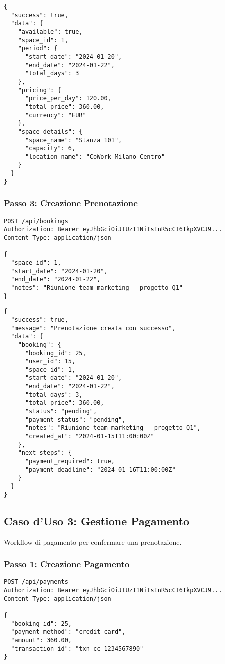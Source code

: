 \begin{lstlisting}[caption=Risposta Disponibilità Confermata]
{
  "success": true,
  "data": {
    "available": true,
    "space_id": 1,
    "period": {
      "start_date": "2024-01-20",
      "end_date": "2024-01-22",
      "total_days": 3
    },
    "pricing": {
      "price_per_day": 120.00,
      "total_price": 360.00,
      "currency": "EUR"
    },
    "space_details": {
      "space_name": "Stanza 101",
      "capacity": 6,
      "location_name": "CoWork Milano Centro"
    }
  }
}
\end{lstlisting}

\subsubsection{Passo 3: Creazione Prenotazione}
\begin{lstlisting}[style=httpstyle, caption=Creazione Prenotazione]
POST /api/bookings
Authorization: Bearer eyJhbGciOiJIUzI1NiIsInR5cCI6IkpXVCJ9...
Content-Type: application/json

{
  "space_id": 1,
  "start_date": "2024-01-20",
  "end_date": "2024-01-22",
  "notes": "Riunione team marketing - progetto Q1"
}
\end{lstlisting}

\newpage

\begin{lstlisting}[caption=Risposta Prenotazione Creata]
{
  "success": true,
  "message": "Prenotazione creata con successo",
  "data": {
    "booking": {
      "booking_id": 25,
      "user_id": 15,
      "space_id": 1,
      "start_date": "2024-01-20",
      "end_date": "2024-01-22",
      "total_days": 3,
      "total_price": 360.00,
      "status": "pending",
      "payment_status": "pending",
      "notes": "Riunione team marketing - progetto Q1",
      "created_at": "2024-01-15T11:00:00Z"
    },
    "next_steps": {
      "payment_required": true,
      "payment_deadline": "2024-01-16T11:00:00Z"
    }
  }
}
\end{lstlisting}

\subsection{Caso d'Uso 3: Gestione Pagamento}
Workflow di pagamento per confermare una prenotazione.

\subsubsection{Passo 1: Creazione Pagamento}
\begin{lstlisting}[style=httpstyle, caption=Processamento Pagamento]
POST /api/payments
Authorization: Bearer eyJhbGciOiJIUzI1NiIsInR5cCI6IkpXVCJ9...
Content-Type: application/json

{
  "booking_id": 25,
  "payment_method": "credit_card",
  "amount": 360.00,
  "transaction_id": "txn_cc_1234567890"
}
\end{lstlisting}

